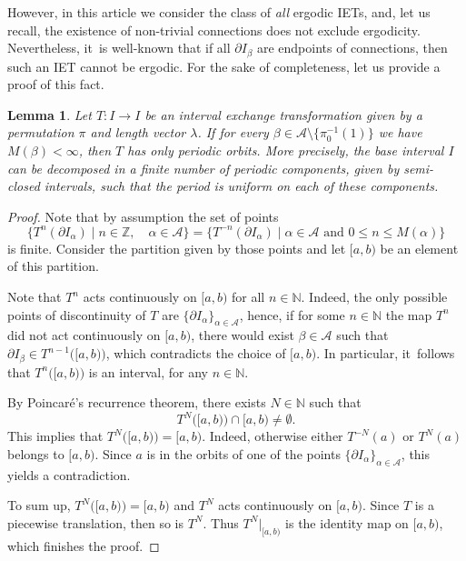 \documentclass[10pt,a4paper]{amsart}
\theoremstyle{plain}
\newtheorem{lemma}[theorem]{Lemma}
\theoremstyle{definition}
\newcommand{\A}{\mathcal{A}}
\newcommand{\Z}{\mathbb{Z}}
\newcommand{\N}{\mathbb{N}}
\begin{document}
However, in this article we consider the class of \emph{all} ergodic IETs, and, let us recall, the existence of non-trivial connections does not exclude ergodicity. Nevertheless, it~is well-known that if all $\partial I_{\beta}$ are endpoints of connections, then such an IET cannot be ergodic. For the sake of completeness, let us provide a proof of this fact.

\begin{lemma}\label{lem: notallconnections}
Let $T:I\to I$ be an interval exchange transformation given by a permutation $\pi$ and length vector $\lambda$. If for every $\beta\in \A\setminus \{\pi_0^{-1}(1)\}$ we have $M(\beta)<\infty$, then $T$ has only periodic orbits. {More precisely, the base interval $I$ can be decomposed in a finite number of periodic components, given by semi-closed intervals, such that the period is uniform on each of these components.}
\end{lemma}

\begin{proof}
Note that by assumption the set of points
\[
\{T^{n}(\partial I_{\alpha})\mid n\in\Z,\quad\alpha\in \A\}=\{T^{-n}(\partial I_{\alpha})\mid \alpha\in\A\text{ and } 0\le n\le M(\alpha)\}
\]
is finite. Consider the partition given by those points and let $[a,b)$ be an element of this partition.

Note that $T^n$ acts continuously on $[a,b)$ for all $n\in\N$. Indeed, the only possible points of discontinuity of $T$ are $\{\partial I_{\alpha}\}_{\alpha\in\A}$, hence, if for some $n\in\N$ the map $T^n$ did not act continuously on $[a,b)$, there would exist $\beta\in\mathcal A$ such that $\partial I_{\beta}\in T^{n-1}\big([a,b)\big)$, which contradicts the choice of $[a,b)$. In particular, it~follows that $T^n\big([a,b)\big)$ is an interval, for any $n \in \N$.

By Poincaré's recurrence theorem, there exists $N\in\N$ such that
\[
T^{N}\big([a,b)\big)\cap [a,b)\neq \emptyset.
\]
This implies that $T^{N}\big([a,b)\big)=[a,b)$. Indeed, otherwise either $T^{-N}(a)$ or $T^{N}(a)$ belongs to $[a,b)$. Since $a$ is in the orbits of one of the points $\{\partial I_{\alpha}\}_{\alpha\in\A}$, this yields a contradiction.

To sum up, $T^{N}\big([a,b)\big)=[a,b)$ and $T^N$ acts continuously on $[a,b)$. Since $T$ is a piecewise translation, then so is $T^N$. Thus $T^N|_{[a,b)}$ is the identity map on $[a,b)$, which finishes the proof.
\end{proof}
\end{document}

